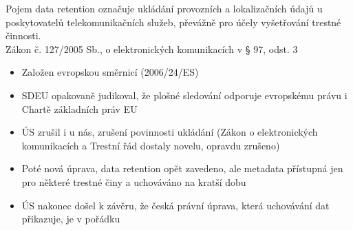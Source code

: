 Pojem data retention označuje ukládání provozních a lokalizačních údajů u poskytovatelů telekomunikačních služeb, převážně pro účely vyšetřování trestné činnosti.\\
Zákon č. 127/2005 Sb., o elektronických komunikacích v § 97, odst. 3
\begin{itemize}
    \item Založen evropskou směrnicí (2006/24/ES)
    \item SDEU opakovaně judikoval, že plošné sledování odporuje evropskému právu i Chartě základních práv EU
    \item ÚS zrušil i u nás, zrušení povinnosti ukládání (Zákon o elektronických komunikacích a Trestní řád dostaly novelu, opravdu zrušeno)
    \item Poté nová úprava, data retention opět zavedeno, ale metadata přístupná jen pro některé trestné činy a uchováváno na kratší dobu
    \item ÚS nakonec došel k závěru, že česká právní úprava, která uchovávání dat přikazuje, je v pořádku
\end{itemize}
